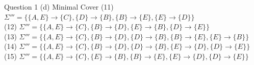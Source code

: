 \begin{frame}[fragile]{Question 1 (d) Minimal Cover}
{	(11) $\Sigma'''=\{\{A, E\} \rightarrow \{C\}, \{D\} \rightarrow \{B\}, \{B\} \rightarrow \{E\}, \{E\} \rightarrow \{D\}\}$ \\\vspace{2pt}
	(12) $\Sigma'''=\{\{A, E\} \rightarrow \{C\}, \{B\} \rightarrow \{D\}, \{E\} \rightarrow \{B\}, \{D\} \rightarrow \{E\}\}$ \\\vspace{2pt}
	(13) $\Sigma'''=\{\{A, E\} \rightarrow \{C\}, \{B\} \rightarrow \{D\}, \{D\} \rightarrow \{B\}, \{B\} \rightarrow \{E\}, \{E\} \rightarrow \{B\}\}$ \\\vspace{2pt}
	(14) $\Sigma'''=\{\{A, E\} \rightarrow \{C\}, \{B\} \rightarrow \{D\}, \{D\} \rightarrow \{B\}, \{E\} \rightarrow \{D\}, \{D\} \rightarrow \{E\}\}$ \\\vspace{2pt}
	(15) $\Sigma'''=\{\{A, E\} \rightarrow \{C\}, \{E\} \rightarrow \{B\}, \{B\} \rightarrow \{E\}, \{E\} \rightarrow \{D\}, \{D\} \rightarrow \{E\}\}$ \\\vspace{2pt}
	}
\end{frame}

